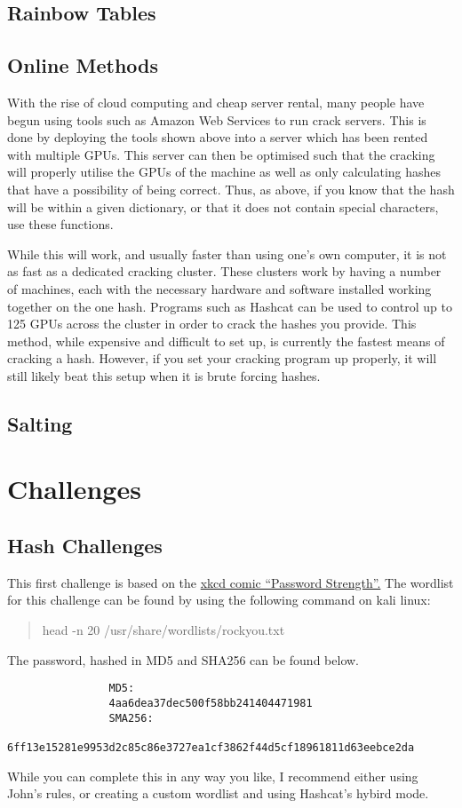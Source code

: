 \documentclass[a4paper,11pt]{report}
\begin{document}
		\subsection{Rainbow Tables}
		\subsection{Online Methods}
			With the rise of cloud computing and cheap server rental, many people have begun using tools such as Amazon Web Services to run crack servers. 
			This is done by deploying the tools shown above into a server which has been rented with multiple GPUs. 
			This server can then be optimised such that the cracking will properly utilise the GPUs of the machine as well as only calculating hashes that have a possibility of being correct. 
			Thus, as above, if you know that the hash will be within a given dictionary, or that it does not contain special characters, use these functions. 

			While this will work, and usually faster than using one's own computer, it is not as fast as a dedicated cracking cluster. 
			These clusters work by having a number of machines, each with the necessary hardware and software installed working together on the one hash. 
			Programs such as Hashcat can be used to control up to 125 GPUs across the cluster in order to crack the hashes you provide. 
			This method, while expensive and difficult to set up, is currently the fastest means of cracking a hash. 
			However, if you set your cracking program up properly, it will still likely beat this setup when it is brute forcing hashes. 
		\subsection{Salting}
	\section{Challenges}
		\subsection{Hash Challenges}
			This first challenge is based on the \href{https://xkcd.com/936/}{xkcd comic ``Password Strength''.}
			The wordlist for this challenge can be found by using the following command on kali linux:
			\begin{quote}
				head -n 20 /usr/share/wordlists/rockyou.txt
			\end{quote}
			The password, hashed in MD5 and SHA256 can be found below. 
			\begin{verbatim}
				MD5: 
				4aa6dea37dec500f58bb241404471981
				SMA256: 
				6ff13e15281e9953d2c85c86e3727ea1cf3862f44d5cf18961811d63eebce2da 
			\end{verbatim}
			While you can complete this in any way you like, I recommend either using John's rules, or creating a custom wordlist and using Hashcat's hybird mode. 
\end{document}

